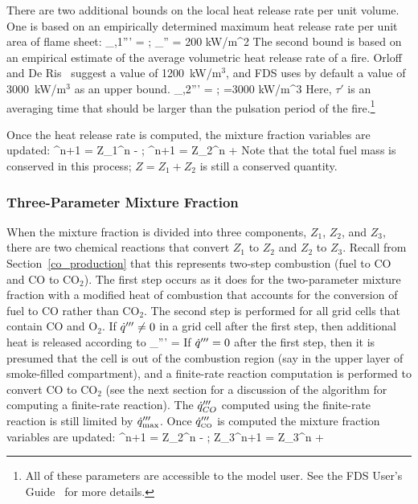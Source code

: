 \documentclass[11pt]{book}
\begin{document}
There are two additional bounds on the local heat release rate per unit volume. One is based on an empirically determined maximum heat release rate
per unit area of flame sheet:
\be \dq_{\max,1}''' =   \quad ; \quad  \dq_{\max}'' = 200 \; \; \hbox{kW/m}^2  \ee
The second bound is based on an empirical estimate of the average volumetric heat release rate
of a fire. Orloff and De Ris~\cite{Orloff:19th_Symposium} suggest a value of 1200~kW/m$^3$, and FDS uses by default a value of 3000~kW/m$^3$ as an upper bound.
\be \dq_{\max,2}''' =  \quad ; \quad  {}=3000 \; \; \hbox{kW/m}^3   \ee
Here, $\tau'$ is an averaging time that should be larger than the pulsation period of the fire.\footnote{
All of these parameters are accessible to the model user. See the FDS User's Guide~\cite{FDS_Users_Guide_5} for more details.}

Once the heat release rate is computed, the mixture fraction variables are updated:
^{n+1} = {Z_1}^n -   \quad ; ^{n+1} =
{Z_2}^n +  \ee
Note that the total fuel mass is conserved in this process; $Z=Z_1+Z_2$ is still a conserved quantity.


\subsubsection{Three-Parameter Mixture Fraction}

When the mixture fraction is divided into three components, $Z_1$, $Z_2$, and $Z_3$, there are two chemical
reactions that convert $Z_1$ to $Z_2$ and $Z_2$ to $Z_3$.  Recall from Section~\ref{co_production}
that this represents two-step combustion (fuel to CO and CO to CO$_2$).
The first step occurs as it does for the two-parameter mixture fraction with a modified heat of combustion that
accounts for the conversion of fuel to CO rather than CO$_2$.
The second step is performed for all grid cells that contain CO and O$_2$.   If $\dot{q}''' \neq 0$ in a grid
cell after the first step, then additional heat is released according to
\be \dq_{\CO}''' = \min {}     \ee
If $\dot{q}'''=0$ after the first step, then it is presumed that the cell is out of the combustion region (say in the upper layer of
smoke-filled compartment), and a finite-rate reaction computation is performed to convert CO to CO$_2$ (see the next section for
a discussion of the algorithm for computing a finite-rate reaction).  The $\dot{q}'''_{CO}$ computed using the finite-rate
reaction is still limited by $\dot{q}_{\max}'''$.  Once $\dot{q}'''_{{\tiny \hbox{CO}}}$ is computed the mixture fraction variables are updated:
^{n+1} = {Z_2}^n -  \quad ; \quad
{Z_3}^{n+1} = {Z_3}^n +  \ee
\end{document}
